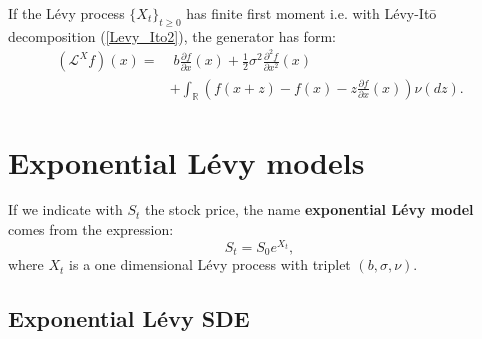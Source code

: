 \documentclass[a4paper,10pt]{article}
\newcommand{\numberset}{\mathbb}
\newcommand{\R}{\numberset{R}}
\newcommand{\LL}{\mathcal{L}}
\begin{document}
If the Lévy process $\{X_t\}_{t \geq 0}$ has finite first moment i.e. with Lévy-It\=o decomposition (\ref{Levy_Ito2}), the generator has form:
\begin{align}\label{genLevy2}
 (\LL^X f)(x) =& \; b \frac{\partial f}{\partial x}(x) +
  \frac{1}{2} \sigma^2 \frac{\partial^2 f}{\partial x^2}(x)\\  \nonumber
           & + \int_{\R} \left( f(x+z) - f(x) - z \frac{\partial f}{\partial x}(x) \right) \nu(dz).
\end{align}



\section{Exponential Lévy models}\label{Section_ELM}


If we indicate with $S_t$ the stock price,
the name \textbf{exponential Lévy model} comes from the expression: 
\begin{equation}\label{ELM}
 S_t = S_0 e^{X_t} ,
\end{equation}
where $X_t$ is a one dimensional Lévy process with triplet $(b,\sigma,\nu)$.


\subsection{Exponential Lévy SDE}
\end{document}
